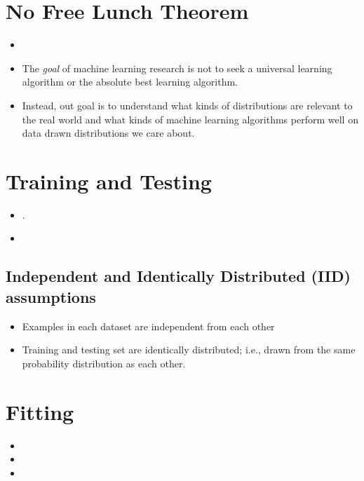 \documentclass[
	title={ML Fundamentals}
]{cs584notes}
\begin{document}
\section{No Free Lunch Theorem}\label{sec:no-free-lunch-theorem}
\begin{itemize}
	\item {}
	\item The \emph{goal} of machine learning research is not to seek a universal learning algorithm or the absolute best learning algorithm.
	\item Instead, out goal is to understand what kinds of distributions are relevant to the real world and what kinds of machine learning algorithms perform well on data drawn distributions we care about.
\end{itemize}

\section{Training and Testing}\label{sec:training-and-testing}
\begin{itemize}
	\item {}.
	\item {}
\end{itemize}

\subsection{Independent and Identically Distributed (IID) assumptions}\label{subsec:independent-and-identically-distributed-(iid)-assumptions}
\begin{itemize}
	\item Examples in each dataset are independent from each other
	\item Training and testing set are identically distributed; i.e., drawn from the same probability distribution as each other.
\end{itemize}

\section{Fitting}\label{sec:fitting}
\begin{itemize}
	\item {}
	\item {}
	\item {}
\end{itemize}
\end{document}
